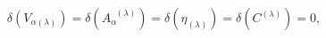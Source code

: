 \begin{equation}
\delta \left( V_{\alpha (\lambda )}\right) =\delta \left( A_{\alpha
}^{\;\;(\lambda )}\right) =\delta \left( \eta _{(\lambda )}\right) =\delta
\left( C^{(\lambda )}\right) =0,  \label{bf45}
\end{equation}


